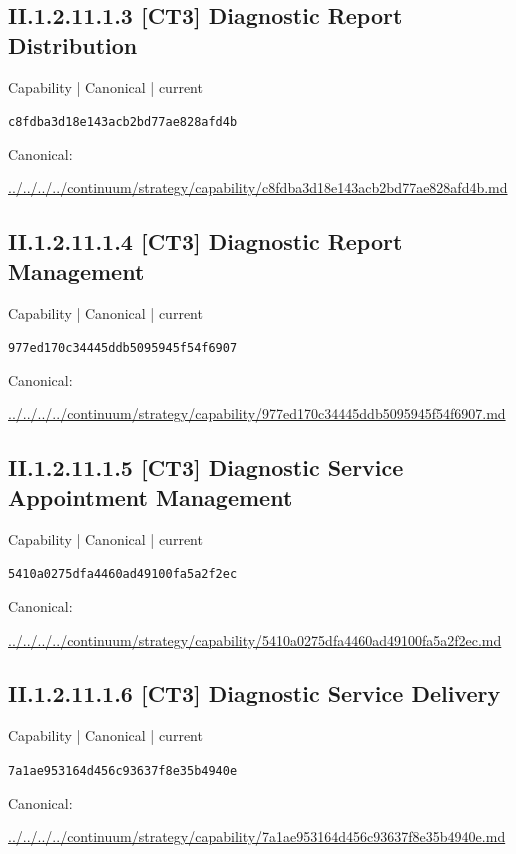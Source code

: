 \documentclass[10pt,a4paper]{article}
\begin{document}
\subsection*{II.1.2.11.1.3 [CT3] Diagnostic Report Distribution}
{\small Capability | Canonical | current}\par
\texttt{c8fdba3d18e143acb2bd77ae828afd4b}\par
Canonical: \par
{\footnotesize\url{../../../../continuum/strategy/capability/c8fdba3d18e143acb2bd77ae828afd4b.md}}\par
\subsection*{II.1.2.11.1.4 [CT3] Diagnostic Report Management}
{\small Capability | Canonical | current}\par
\texttt{977ed170c34445ddb5095945f54f6907}\par
Canonical: \par
{\footnotesize\url{../../../../continuum/strategy/capability/977ed170c34445ddb5095945f54f6907.md}}\par
\subsection*{II.1.2.11.1.5 [CT3] Diagnostic Service Appointment Management}
{\small Capability | Canonical | current}\par
\texttt{5410a0275dfa4460ad49100fa5a2f2ec}\par
Canonical: \par
{\footnotesize\url{../../../../continuum/strategy/capability/5410a0275dfa4460ad49100fa5a2f2ec.md}}\par
\subsection*{II.1.2.11.1.6 [CT3] Diagnostic Service Delivery}
{\small Capability | Canonical | current}\par
\texttt{7a1ae953164d456c93637f8e35b4940e}\par
Canonical: \par
{\footnotesize\url{../../../../continuum/strategy/capability/7a1ae953164d456c93637f8e35b4940e.md}}\par
\end{document}
